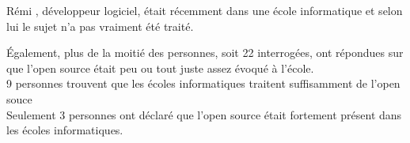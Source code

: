 				Rémi , développeur logiciel, était récemment dans une école informatique et selon lui le sujet n'a pas vraiment été traité.

				\begin{center}
					\textit{
					}
				\end{center}

				Également, plus de la moitié des personnes, soit 22 interrogées, ont répondues sur que l'open source était peu ou tout juste assez évoqué à l'école.\\

				9 personnes trouvent que les écoles informatiques traitent suffisamment de l'open souce\\

				Seulement 3 personnes ont déclaré que l'open source était fortement présent dans les écoles informatiques.

